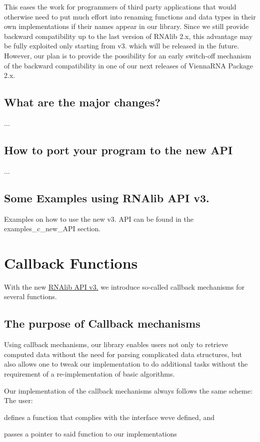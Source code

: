 This eases the work for programmers of third party applications that would otherwise need to put much effort into renaming functions and data types in their own implementations if their names appear in our library. Since we still provide backward compatibility up to the last version of R\+N\+Alib 2.\+x, this advantage may be fully exploited only starting from v3. which will be released in the future. However, our plan is to provide the possibility for an early switch-\/off mechanism of the backward compatibility in one of our next releases of Vienna\+R\+NA Package 2.\+x.\hypertarget{newAPI_newAPI_changes}{}\subsection{What are the major changes?}\label{newAPI_newAPI_changes}
...\hypertarget{newAPI_newAPI_porting}{}\subsection{How to port your program to the new A\+PI}\label{newAPI_newAPI_porting}
...\hypertarget{newAPI_newAPI_examples}{}\subsection{Some Examples using R\+N\+Alib A\+P\+I v3.}\label{newAPI_newAPI_examples}
Examples on how to use the new v3. A\+PI can be found in the examples\+\_\+c\+\_\+new\+\_\+\+A\+PI section. \hypertarget{callbacks}{}\section{Callback Functions}\label{callbacks}
With the new \hyperlink{newAPI}{R\+N\+Alib A\+PI v3.} we introduce so-\/called callback mechanisms for several functions.\hypertarget{callbacks_callbacks_intro}{}\subsection{The purpose of Callback mechanisms}\label{callbacks_callbacks_intro}
Using callback mechanisms, our library enables users not only to retrieve computed data without the need for parsing complicated data structures, but also allows one to tweak our implementation to do additional tasks without the requirement of a re-\/implementation of basic algorithms.

Our implementation of the callback mechanisms always follows the same scheme\+: The user\+:
\begin{DoxyItemize}
\item defines a function that complies with the interface we\textquotesingle{}ve defined, and
\item passes a pointer to said function to our implementations
\end{DoxyItemize}

